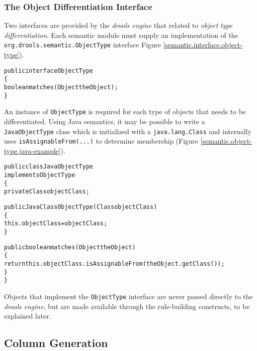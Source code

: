 \documentclass[10pt,twocolumn,letterpaper]{article}
\newenvironment{codelisting}%
	{\begin{minipage}{250pt}\small\begin{alltt}}%
	{\end{alltt}\end{minipage}}
\begin{document}
\subsubsection{The Object Differentiation Interface}

Two interfaces are provided by the \emph{drools engine} that related
to \emph{object type differentiation}.  Each semantic module must 
supply an implementation of the \verb|org.drools.semantic.ObjectType| 
interface Figure \ref{semantic.interface.object-type}).

\begin{figure*}[p]
	\begin{codelisting}
	public interface ObjectType
	\{
	     boolean matches(Object theObject);
	\}
	\end{codelisting}
	\caption{The \emph{ObjectType} interface.}
	\label{semantic.interface.object-type}
\end{figure*}

An instance of \verb|ObjectType| is required for each type of objects
that needs to be differentiated.  Using Java semantics, it may be
possible to write a \verb|JavaObjectType| class which is 
initialized with a \verb|java.lang.Class| and internally uses
\verb|isAssignableFrom(...)| to determine membership 
(Figure \ref{semantic.object-type.java-example}).

\begin{figure*}[p]
	\begin{codelisting}
	public class JavaObjectType 
	             implements ObjectType
	\{
	     private Class objectClass;

	     public JavaClassObjectType(Class objectClass)
	     \{
	          this.objectClass = objectClass;
	     \}

	     public boolean matches(Object theObject)
	     \{
	          return this.objectClass.isAssignableFrom( theObject.getClass() );
	     \}
	\}
	\end{codelisting}
	\caption{Example \emph{ObjectType} implementing Java class semantics, including polymorphism.} 
	\label{semantic.object-type.java-example}
\end{figure*}

Objects that implement the \verb|ObjectType| interface are never
passed directly to the \emph{drools engine}, but are made available
through the rule-building constructs, to be explained later.

\subsection{Column Generation}
\end{document}
